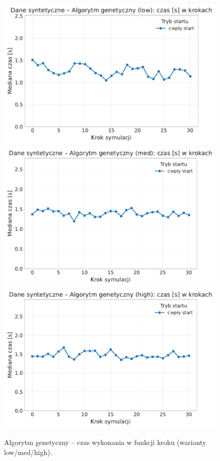 \begin{figure}[H]
  \centering
  \includegraphics[width=0.62\linewidth]{assets/figures/dynamic/synthetic/synthetic_algorytm_genetyczny_time_over_steps_low.pdf}\\[0.4em]
  \includegraphics[width=0.62\linewidth]{assets/figures/dynamic/synthetic/synthetic_algorytm_genetyczny_time_over_steps_med.pdf}\\[0.4em]
  \includegraphics[width=0.62\linewidth]{assets/figures/dynamic/synthetic/synthetic_algorytm_genetyczny_time_over_steps_high.pdf}
  \caption{Algorytm genetyczny -- czas wykonania w funkcji kroku (warianty low/med/high).}
  \label{fig:dyn-synth-genetic-time}
\end{figure}

